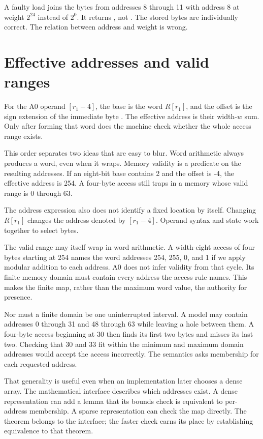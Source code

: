 \begin{example}[title={A control that reverses the weights}]
A faulty load joins the bytes from addresses 8 through 11 with address 8 at
weight \(2^{24}\) instead of \(2^0\). It returns , not
. The stored bytes are individually correct. The relation
between address and weight is wrong.
\end{example}

\section{Effective addresses and valid ranges}

For the A0 operand \([r_1-4]\), the base is the word \(R[r_1]\), and the
offset is the sign extension of the immediate byte . The effective
address is their width-\(w\) sum. Only after forming that word does the machine
check whether the whole access range exists.

This order separates two ideas that are easy to blur. Word arithmetic always
produces a word, even when it wraps. Memory validity is a predicate on the
resulting addresses. If an eight-bit base contains 2 and the offset is -4, the
effective address is 254. A four-byte access still traps in a memory whose
valid range is 0 through 63.

The address expression also does not identify a fixed location by itself.
Changing \(R[r_1]\) changes the address denoted by \([r_1-4]\). Operand syntax
and state work together to select bytes.

The valid range may itself wrap in word arithmetic. A width-eight access of
four bytes starting at 254 names the word addresses 254, 255, 0, and 1 if we
apply modular addition to each address. A0 does not infer validity from that
cycle. Its finite memory domain must contain every address the access rule
names. This makes the finite map, rather than the maximum word value, the
authority for presence.

Nor must a finite domain be one uninterrupted interval. A model may contain
addresses 0 through 31 and 48 through 63 while leaving a hole between them.
A four-byte access beginning at 30 then finds its first two bytes and misses
its last two. Checking that 30 and 33 fit within the minimum and maximum
domain addresses would accept the access incorrectly. The semantics asks
membership for each requested address.

That generality is useful even when an implementation later chooses a dense
array. The mathematical interface describes which addresses exist. A dense
representation can add a lemma that its bounds check is equivalent to
per-address membership. A sparse representation can check the map directly.
The theorem belongs to the interface; the faster check earns its place by
establishing equivalence to that theorem.

